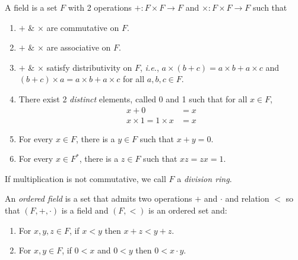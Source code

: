 \begin{definition} \label{def:field}
    A field is a set $F$ with 2 operations $+ : F \times F \to F$ and
    $\times : F \times F \to F$ such that
    \begin{enumerate}[label=\small(F\arabic*)]
        \item \label{def:field:commutativity}
            $+$ \& $\times$ are commutative on $F$.
        \item \label{def:field:associativity}
            $+$ \& $\times$ are associative on $F$.
        \item \label{def:field:distributivity}
            $+$ \& $\times$ satisfy distributivity on $F$, \textit{i.e.},
            $a \times (b + c) = a \times b + a \times c$ and
            $(b + c) \times a = a \times b + a \times c$ for all
            $a, b, c \in F$. 
        \item \label{def:field:identity}
            There exist 2 \emph{distinct} elements, called 0 and 1 such that
            for all $x \in F$,
            \begin{align*}
                x + 0 &= x \\
                x \times 1 = 1 \times x &= x
            \end{align*}
        \item \label{def:field:negative}
            For every $x \in F$, there is a $y \in F$ such that $x + y = 0$.
        \item \label{def:field:reciprocal}
            For every $x \in F^*$, there is a $z \in F$ such that
            $xz = zx = 1$.
    \end{enumerate}
    If multiplication is not commutative, we call $F$ a 
    \emph{division ring}.
\end{definition}

\begin{definition} \label{def:ordered_field}
    An \emph{ordered field} is a set that admits two operations $+$ and
    $\cdot$ and relation $<$ so that $(F, +, \cdot)$ is a field and $(F, <)$
    is an ordered set and:
    \begin{enumerate}[label=\small(OF\arabic*)]
        \item \label{def:order:sum}
            For $x, y, z \in F$, if $x < y$ then $x + z < y + z$.
        \item \label{def:order:product}
            For $x, y \in F$, if $0 < x$ and $0 < y$ then $0 < x \cdot y$.
    \end{enumerate}
\end{definition}

